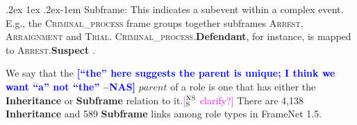 \documentclass[11pt,a4paper]{article}
\makeatletter
\newcommand{\ensuretext}[1]{#1}
\newcommand{\nssmarker}{\ensuretext{\textcolor{magenta}{\ensuremath{^{\textsc{NS}}_{\textsc{S}}}}}}
\newcommand{\arkcomment}[3]{\ensuretext{\textcolor{#3}{[#1 #2]}}}
\newcommand{\nss}[1]{\arkcomment{\nssmarker}{#1}{magenta}}
\newcommand{\nascomment}[1]{\textcolor{blue}{\textbf{\small [#1 --NAS]}}}
\renewcommand{\paragraph}{%
  \@startsection{paragraph}{4}%
  {\z@}{.2ex \@plus 1ex \@minus .2ex}{-1em}%
  {\normalfont\normalsize\bfseries}%
}
\newcommand{\fnf}[1]{\textsc{\textsf{#1}}} %
\newcommand{\fnr}[1]{\textbf{\textsf{#1}}} %
\newcommand{\fnlu}[1]{\textsf{#1}} %
\newcommand{\finalversion}[1]{}
\makeatother
\begin{document}

\paragraph{Subframe:} This indicates a subevent within a complex event. 
E.g., the \fnf{Criminal\_process} frame groups together subframes 
\fnf{Arrest}, \fnf{Arraignment} and \fnf{Trial}.
\fnf{Criminal\_process}.\fnr{Defendant}, for instance, is mapped to 
\fnf{Arrest}.\fnr{Suspect}%
\finalversion{
\fnf{Trial}.\fnr{Defendant}, and \fnf{Sentencing}.\fnr{Convict}
}.

We say that the \nascomment{``the'' here suggests the parent is
  unique; I think we want ``a'' not ``the''} $\textit{parent}$ of a role is one that has either the \textbf{Inheritance} or \textbf{Subframe} relation to it.\nss{clarify?}
There are 4,138 \textbf{Inheritance} and 589 \textbf{Subframe} links among role types in FrameNet 1.5.
\end{document}
